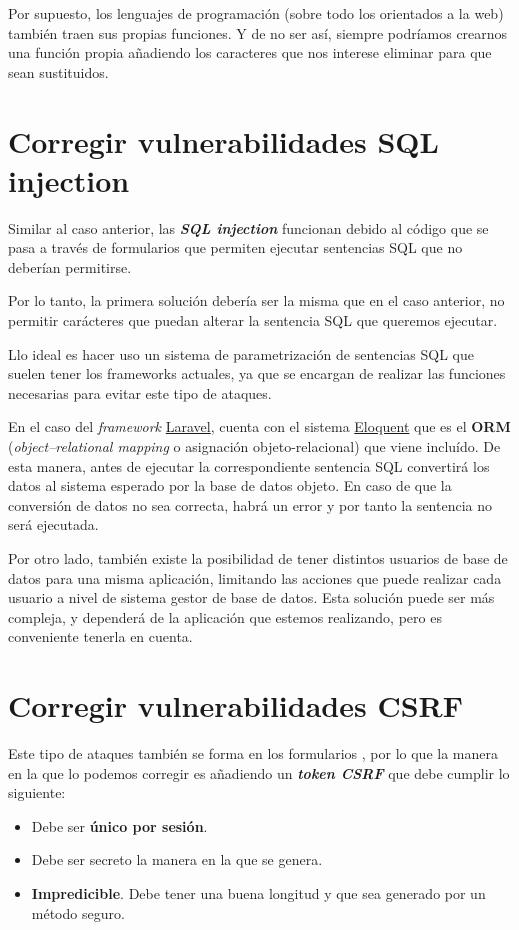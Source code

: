 \documentclass{\ClassPath/viu-tfm-template}
\begin{document}
Por supuesto, los lenguajes de programación (sobre todo los orientados a la web) también traen sus propias funciones. Y de no ser así, siempre podríamos crearnos una función propia añadiendo los caracteres que nos interese eliminar para que sean sustituidos.


\section{Corregir vulnerabilidades SQL injection}

Similar al caso anterior, las \textbf{\textit{SQL injection}} funcionan debido al código que se pasa a través de formularios que permiten ejecutar sentencias SQL que no deberían permitirse.

Por lo tanto, la primera solución debería ser la misma que en el caso anterior, no permitir carácteres que puedan alterar la sentencia SQL que queremos ejecutar.

Llo ideal es hacer uso un sistema de parametrización de sentencias SQL que suelen tener los frameworks actuales, ya que se encargan de realizar las funciones necesarias para evitar este tipo de ataques.

En el caso del \textit{framework} \href{https://laravel.com/}{Laravel}, cuenta con el sistema \href{https://laravel.com/docs/6.x/eloquent}{Eloquent} que es el \textbf{ORM} (\textit{object–relational mapping} o asignación objeto-relacional) que viene incluído. De esta manera, antes de ejecutar la correspondiente sentencia SQL convertirá los datos al sistema esperado por la base de datos objeto. En caso de que la conversión de datos no sea correcta, habrá un error y por tanto la sentencia no será ejecutada.


Por otro lado, también existe la posibilidad de tener distintos usuarios de base de datos para una misma aplicación, limitando las acciones que puede realizar cada usuario a nivel de sistema gestor de base de datos. Esta solución puede ser más compleja, y dependerá de la aplicación que estemos realizando, pero es conveniente tenerla en cuenta.


\section{Corregir vulnerabilidades CSRF}
Este tipo de ataques también se forma en los formularios , por lo que la manera en la que lo podemos corregir es añadiendo un \textit{\textbf{token CSRF}} que debe cumplir lo siguiente:

\begin{itemize}
    \item Debe ser \textbf{único por sesión}.
    \item Debe ser secreto la manera en la que se genera.
    \item \textbf{Impredicible}. Debe tener una buena longitud y que sea generado por un método seguro.
\end{itemize}
\end{document}
